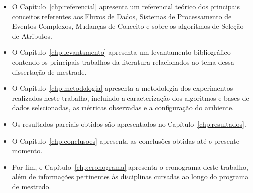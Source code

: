 \begin{itemize}
\item O Capítulo~\ref{chp:referencial} apresenta um referencial teórico dos principais conceitos referentes aos Fluxos de Dados, Sistemas de Processamento de Eventos Complexos, Mudanças de Conceito e sobre os algoritmos de Seleção de Atributos.
\item O Capítulo~\ref{chp:levantamento} apresenta um levantamento bibliográfico contendo os principais trabalhos da literatura relacionados ao tema dessa dissertação de mestrado. 
\item O Capítulo~\ref{chp:metodologia} apresenta a metodologia dos experimentos realizados neste trabalho, incluindo a caracterização dos algoritmos e bases de dados selecionadas, as métricas observadas e a configuração do ambiente.
\item Os resultados parciais obtidos são apresentados no Capítulo~\ref{chp:resultados}.
\item O Capítulo~\ref{chp:conclusoes} apresenta as conclusões obtidas até o presente momento.
\item Por fim, o Capítulo~\ref{chp:cronograma} apresenta o cronograma deste trabalho, além de informações pertinentes às disciplinas cursadas ao longo do programa de mestrado.
\end{itemize}



